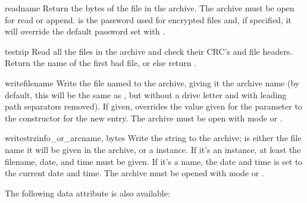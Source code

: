 \begin{methoddesc}{read}{name}
  Return the bytes of the file in the archive.  The archive must be
  open for read or append.  is the password used for encrypted 
  files and, if specified, it will override the default password set with
  .

\end{methoddesc}

\begin{methoddesc}{testzip}{}
  Read all the files in the archive and check their CRC's and file
  headers.  Return the name of the first bad file, or else return .
\end{methoddesc}

\begin{methoddesc}{write}{filename}
  Write the file named  to the archive, giving it the
  archive name  (by default, this will be the same as
  , but without a drive letter and with leading path
  separators removed).  If given,  overrides the
  value given for the  parameter to the constructor
  for the new entry.  The archive must be open with mode 
  or .
  

\end{methoddesc}

\begin{methoddesc}{writestr}{zinfo_or_arcname, bytes}
  Write the string  to the archive; 
  is either the file name it will be given in the archive, or a
   instance.  If it's an instance, at least the
  filename, date, and time must be given.  If it's a name, the date
  and time is set to the current date and time. The archive must be
  opened with mode  or .
\end{methoddesc}


The following data attribute is also available:

